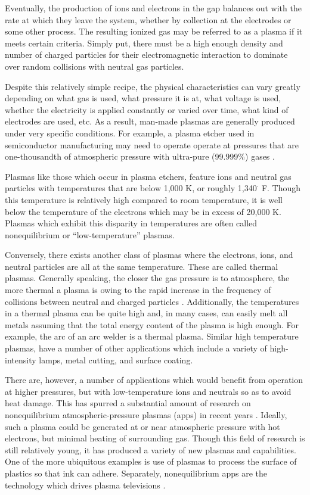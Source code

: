 Eventually, the production of ions and electrons in the gap balances out with
the rate at which they leave the system, whether by collection at the electrodes
or some other process. The resulting ionized gas may be referred to as a plasma
if it meets certain criteria. Simply put, there must be a high enough density
and number of charged particles for their electromagnetic interaction to
dominate over random collisions with neutral gas particles.

Despite this relatively simple recipe, the physical characteristics can vary
greatly depending on what gas is used, what pressure it is at, what voltage is
used, whether the electricity is applied constantly or varied over time, what
kind of electrodes are used, etc. As a result, man-made plasmas are generally
produced under very specific conditions. For example, a plasma etcher used in
semiconductor manufacturing may need to operate operate at pressures that are
one-thousandth of atmospheric pressure with ultra-pure (99.999\%) gases
\cite{Greenberg1993a}.

Plasmas like those which occur in plasma etchers, feature ions and neutral gas
particles with temperatures that are below 1,000 K, or roughly 1,340$^\cdot$ F.
Though this temperature is relatively high compared to room temperature, it is
well below the temperature of the electrons which may be in excess of 20,000 K.
Plasmas which exhibit this disparity in temperatures are often called
nonequilibrium or ``low-temperature'' plasmas.

Conversely, there exists another class of plasmas where the electrons, ions, and
neutral particles are all at the same temperature. These are called thermal
plasmas. Generally speaking, the closer the gas pressure is to atmosphere, the
more thermal a plasma is owing to the rapid increase in the frequency of
collisions between neutral and charged particles \cite{Kunhardt2000}.
Additionally, the temperatures in a thermal plasma can be quite high and, in
many cases, can easily melt all metals assuming that the total energy content of
the plasma is high enough. For example, the arc of an arc welder is a thermal
plasma. Similar high temperature plasmas, have a number of other applications
which include a variety of high-intensity lamps, metal cutting, and surface
coating.

There are, however, a number of applications which would benefit from operation
at higher pressures, but with low-temperature ions and neutrals so as to avoid
heat damage. This has spurred a substantial amount of research on nonequilibrium
atmospheric-pressure plasmas (\acs{app}s) in recent years \cite{Becker2005}.
Ideally, such a plasma could be generated at or near atmospheric pressure with
hot electrons, but minimal heating of surrounding gas. Though this field of
research is still relatively young, it has produced a variety of new plasmas and
capabilities. One of the more ubiquitous examples is use of plasmas to process
the surface of plastics so that ink can adhere. Separately, nonequilibrium
\acs{app}s are the technology which drives plasma televisions \cite{Rauf1999}.

